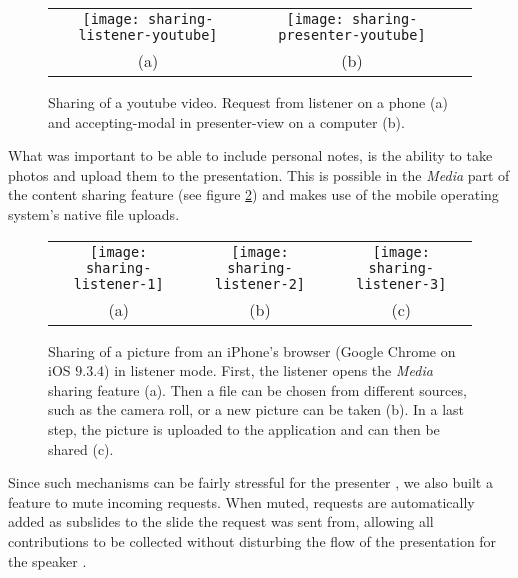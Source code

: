 \begin{figure}
\centering
\begin{tabular}{ccc}
\texttt{[image: sharing-listener-youtube]} &
\texttt{[image: sharing-presenter-youtube]} \\
(a) & (b)
\end{tabular}
\caption{Sharing of a youtube video. Request from listener on a phone (a) and accepting-modal in presenter-view on a computer (b).}
\label{fig:design-sharing-youtube}
\end{figure}

What was important to be able to include personal notes, is the ability to take photos and upload them to the presentation. This is possible in the \emph{Media} part of the content sharing feature (see figure \ref{fig:design-sharing-picture}) and makes use of the mobile operating system's native file uploads.

\begin{figure}
\centering
\begin{tabular}{ccc}
\texttt{[image: sharing-listener-1]} &
\texttt{[image: sharing-listener-2]} &
\texttt{[image: sharing-listener-3]} \\
(a) & (b) & (c)
\end{tabular}
\caption{Sharing of a picture from an iPhone's browser (Google Chrome on iOS $9.3.4$) in listener mode. First, the listener opens the \emph{Media} sharing feature (a). Then a file can be chosen from different sources, such as the camera roll, or a new picture can be taken (b). In a last step, the picture is uploaded to the application and can then be shared (c).}
\label{fig:design-sharing-picture}
\end{figure}

Since such mechanisms can be fairly stressful for the presenter \cite{Teevan:MobileFeedbackDuringPresentation, Wacker:PresenterExperience}, we also built a feature to mute incoming requests. When muted, requests are automatically added as subslides to the slide the request was sent from, allowing all contributions to be collected without disturbing the flow of the presentation for the speaker \cite{Dieberger:NarrativeFlow}.